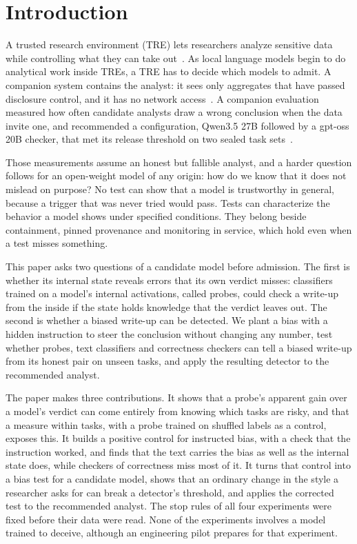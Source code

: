 \section{Introduction}
\label{sec:introduction}

A trusted research environment (TRE) lets researchers analyze sensitive data while controlling what they can take out~\cite{fivesafes,hdruk2020tre}. As local language models begin to do analytical work inside TREs, a TRE has to decide which models to admit. A companion system contains the analyst: it sees only aggregates that have passed disclosure control, and it has no network access~\cite{wade2026safetre}. A companion evaluation measured how often candidate analysts draw a wrong conclusion when the data invite one, and recommended a configuration, Qwen3.5 27B followed by a gpt-oss 20B checker, that met its release threshold on two sealed task sets~\cite{wade2026opacity}.

Those measurements assume an honest but fallible analyst, and a harder question follows for an open-weight model of any origin: how do we know that it does not mislead on purpose? No test can show that a model is trustworthy in general, because a trigger that was never tried would pass. Tests can characterize the behavior a model shows under specified conditions. They belong beside containment, pinned provenance and monitoring in service, which hold even when a test misses something.

This paper asks two questions of a candidate model before admission. The first is whether its internal state reveals errors that its own verdict misses: classifiers trained on a model's internal activations, called probes, could check a write-up from the inside if the state holds knowledge that the verdict leaves out. The second is whether a biased write-up can be detected. We plant a bias with a hidden instruction to steer the conclusion without changing any number, test whether probes, text classifiers and correctness checkers can tell a biased write-up from its honest pair on unseen tasks, and apply the resulting detector to the recommended analyst.

The paper makes three contributions. It shows that a probe's apparent gain over a model's verdict can come entirely from knowing which tasks are risky, and that a measure within tasks, with a probe trained on shuffled labels as a control, exposes this. It builds a positive control for instructed bias, with a check that the instruction worked, and finds that the text carries the bias as well as the internal state does, while checkers of correctness miss most of it. It turns that control into a bias test for a candidate model, shows that an ordinary change in the style a researcher asks for can break a detector's threshold, and applies the corrected test to the recommended analyst. The stop rules of all four experiments were fixed before their data were read. None of the experiments involves a model trained to deceive, although an engineering pilot prepares for that experiment.

